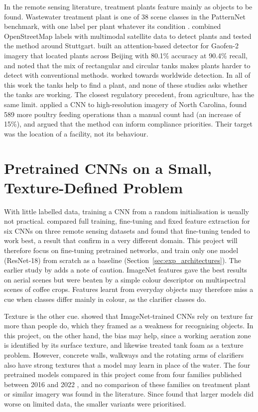 In the remote sensing literature, treatment plants feature mainly as objects to be found. Wastewater treatment plant is one of 38 scene classes in the PatternNet benchmark, with one label per plant whatever its condition \citep{zhou2018patternnet}. \citet{li2022wwtp} combined OpenStreetMap labels with multimodal satellite data to detect plants and tested the method around Stuttgart. \citet{shuai2023} built an attention-based detector for Gaofen-2 imagery that located plants across Beijing with 80.1\% accuracy at 90.4\% recall, and noted that the mix of rectangular and circular tanks makes plants harder to detect with conventional methods. \citet{randhawa2023} worked towards worldwide detection. In all of this work the tanks help to find a plant, and none of these studies asks whether the tanks are working. The closest regulatory precedent, from agriculture, has the same limit. \citet{handannader2019} applied a CNN to high-resolution imagery of North Carolina, found 589 more poultry feeding operations than a manual count had (an increase of 15\%), and argued that the method can inform compliance priorities. Their target was the location of a facility, not its behaviour.

\section{Pretrained CNNs on a Small, Texture-Defined Problem}
\label{sec:pretrained_cnns}

With little labelled data, training a CNN from a random initialisation is usually not practical. \citet{nogueira2017} compared full training, fine-tuning and fixed feature extraction for six CNNs on three remote sensing datasets and found that fine-tuning tended to work best, a result that \citet{borzooei2024} confirm in a very different domain. This project will therefore focus on fine-tuning pretrained networks, and train only one model (ResNet-18) from scratch as a baseline (Section~\ref{sec:exp_architectures}). The earlier study by \citet{penatti2015} adds a note of caution. ImageNet features gave the best results on aerial scenes but were beaten by a simple colour descriptor on multispectral scenes of coffee crops. Features learnt from everyday objects may therefore miss a cue when classes differ mainly in colour, as the clarifier classes do.

Texture is the other cue. \citet{geirhos2019} showed that ImageNet-trained CNNs rely on texture far more than people do, which they framed as a weakness for recognising objects. In this project, on the other hand, the bias may help, since a working aeration zone is identified by its surface texture, and \citet{carballomato2024} likewise treated tank foam as a texture problem. However, concrete walls, walkways and the rotating arms of clarifiers also have strong textures that a model may learn in place of the water. The four pretrained models compared in this project come from four families published between 2016 and 2022 \citep{he2016resnet, huang2017densenet, tan2019efficientnet, liu2022convnext}, and no comparison of these families on treatment plant or similar imagery was found in the literature. Since \citet{borzooei2024} found that larger models did worse on limited data, the smaller variants were prioritised.

